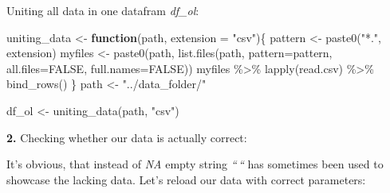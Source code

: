 \documentclass[
]{article}
\newenvironment{Shaded}{\begin{snugshade}}{\end{snugshade}}
\newcommand{\AttributeTok}[1]{\textcolor[rgb]{0.77,0.63,0.00}{#1}}
\newcommand{\ConstantTok}[1]{\textcolor[rgb]{0.00,0.00,0.00}{#1}}
\newcommand{\ControlFlowTok}[1]{\textcolor[rgb]{0.13,0.29,0.53}{\textbf{#1}}}
\newcommand{\FunctionTok}[1]{\textcolor[rgb]{0.00,0.00,0.00}{#1}}
\newcommand{\NormalTok}[1]{#1}
\newcommand{\OtherTok}[1]{\textcolor[rgb]{0.56,0.35,0.01}{#1}}
\newcommand{\SpecialCharTok}[1]{\textcolor[rgb]{0.00,0.00,0.00}{#1}}
\newcommand{\StringTok}[1]{\textcolor[rgb]{0.31,0.60,0.02}{#1}}
\begin{document}
Uniting all data in one datafram \emph{df\_ol}:

\begin{Shaded}
\begin{Highlighting}[]
\NormalTok{uniting\_data }\OtherTok{\textless{}{-}} \ControlFlowTok{function}\NormalTok{(path, }\AttributeTok{extension =} \StringTok{"csv"}\NormalTok{)\{}
\NormalTok{  pattern }\OtherTok{\textless{}{-}} \FunctionTok{paste0}\NormalTok{(}\StringTok{"*."}\NormalTok{, extension)}
\NormalTok{  myfiles }\OtherTok{\textless{}{-}}  \FunctionTok{paste0}\NormalTok{(path, }\FunctionTok{list.files}\NormalTok{(path, }\AttributeTok{pattern=}\NormalTok{pattern, }\AttributeTok{all.files=}\ConstantTok{FALSE}\NormalTok{,}
           \AttributeTok{full.names=}\ConstantTok{FALSE}\NormalTok{))}
\NormalTok{  myfiles }\SpecialCharTok{\%\textgreater{}\%} \FunctionTok{lapply}\NormalTok{(read.csv) }\SpecialCharTok{\%\textgreater{}\%} \FunctionTok{bind\_rows}\NormalTok{()}
\NormalTok{\}}
\NormalTok{path }\OtherTok{\textless{}{-}} \StringTok{"../data\_folder/"}

\NormalTok{df\_ol }\OtherTok{\textless{}{-}} \FunctionTok{uniting\_data}\NormalTok{(path, }\StringTok{"csv"}\NormalTok{)}
\end{Highlighting}
\end{Shaded}

\textbf{2. } Checking whether our data is actually correct:

\begin{Shaded}
\end{Shaded}

It's obvious, that instead of \emph{NA} empty string \emph{``\,``} has
sometimes been used to showcase the lacking data. Let's reload our data
with correct parameters:
\end{document}
